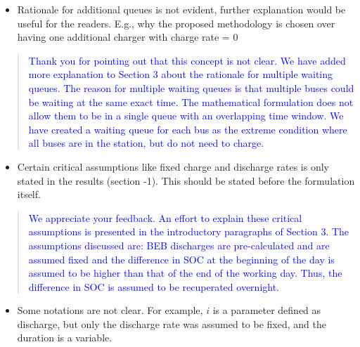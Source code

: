\documentclass[11pt,a4paper,final]{article}
\begin{document}
\begin{itemize}
\item Rationale for additional queues is not evident, further explanation would be useful for the readers. E.g., why the proposed methodology is chosen over having one additional charger with charge rate = 0
\end{itemize}


\begin{quote}
\textcolor{blue}{Thank you for pointing out that this concept is not clear. We have added more explanation to Section 3 about the rationale for multiple waiting queues. The reason for multiple waiting queues is that multiple buses could be waiting at the same exact time. The mathematical formulation does not allow them to be in a single queue with an overlapping time window. We have created a waiting queue for each bus as the extreme condition where all buses are in the station, but do not need to charge.}
\end{quote}

\begin{itemize}
\item Certain critical assumptions like fixed charge and discharge rates is only stated in the results (section -1). This should be stated before the formulation itself.
\end{itemize}

\begin{quote}
\textcolor{blue}{We appreciate your feedback. An effort to explain these critical assumptions is presented in the introductory paragraphs of Section 3. The assumptions discussed are: BEB discharges are pre-calculated and are assumed fixed and the difference in SOC at the beginning of the day is assumed to be higher than that of the end of the working day. Thus, the difference in SOC is assumed to be recuperated overnight.}
\end{quote}

\begin{itemize}
\item Some notations are not clear. For example, \(i\) is a parameter defined as discharge, but only the discharge rate was assumed to be fixed, and the duration is a variable.
\end{itemize}
\end{document}
